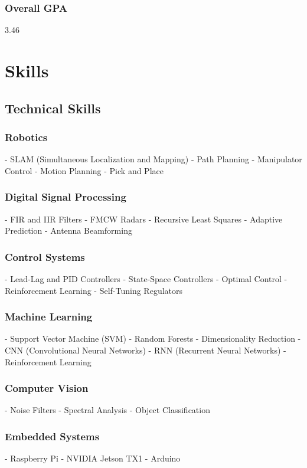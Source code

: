 \documentclass[a4paper]{article}
\begin{document}
\subsubsection{Overall GPA}
3.46

\section{Skills}

\subsection{Technical Skills}
        
\subsubsection{Robotics}
- SLAM (Simultaneous Localization and Mapping)
- Path Planning
- Manipulator Control
- Motion Planning
- Pick and Place
    
\subsubsection{Digital Signal Processing}
- FIR and IIR Filters
- FMCW Radars
- Recursive Least Squares
- Adaptive Prediction
- Antenna Beamforming
    
\subsubsection{Control Systems}
- Lead-Lag and PID Controllers
- State-Space Controllers
- Optimal Control
- Reinforcement Learning
- Self-Tuning Regulators
    
\subsubsection{Machine Learning}
- Support Vector Machine (SVM)
- Random Forests
- Dimensionality Reduction
- CNN (Convolutional Neural Networks)
- RNN (Recurrent Neural Networks)
- Reinforcement Learning
    
\subsubsection{Computer Vision}
- Noise Filters
- Spectral Analysis
- Object Classification
    
\subsubsection{Embedded Systems}
- Raspberry Pi
- NVIDIA Jetson TX1
- Arduino
    
\end{document}

